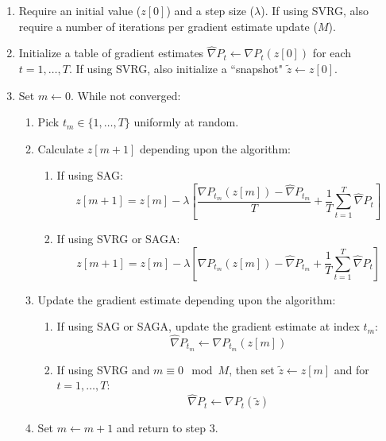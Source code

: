 \begin{enumerate}
    \item Require an initial value ($z[0]$) and a step size ($\lambda$). If using SVRG, also require a number of iterations per gradient estimate update ($M$).
    \item Initialize a table of gradient estimates $\widehat \nabla P_t \leftarrow \nabla P_t (z[0])$ for each $t = 1,\ldots,T$. If using SVRG, also initialize a ``snapshot" $\tilde z \leftarrow z[0]$.
    \item Set $m \leftarrow 0$. While not converged:
    \begin{enumerate}
        \item Pick $t_m \in \{1,\ldots,T\}$ uniformly at random.
        \item Calculate $z[m+1]$ depending upon the algorithm:
        \begin{enumerate}
            \item If using SAG:
            \begin{equation}
                z[m+1] = z[m] - \lambda \left[\frac{\nabla P_{t_m}(z[m]) - \widehat \nabla P_{t_m}}{T} + \frac{1}{T} \sum_{t=1}^T \widehat \nabla P_{t} \right] 
                \label{eqn:SAG_update}
            \end{equation}
            \item If using SVRG or SAGA:
            \begin{equation}
                z[m+1] = z[m] - \lambda \left[\nabla P_{t_m}(z[m]) - \widehat \nabla P_{t_m} + \frac{1}{T} \sum_{t=1}^T \widehat \nabla P_{t} \right]
                \label{eqn:SAGA_update}
            \end{equation}
        \end{enumerate}
        \item Update the gradient estimate depending upon the algorithm:
        \begin{enumerate}
            \item If using SAG or SAGA, update the gradient estimate at index $t_m$:
            \begin{equation}
                \widehat \nabla P_{t_m} \leftarrow \nabla P_{t_m}(z[m])
            \end{equation}
            \item If using SVRG and $m \equiv 0 \mod M$, then set $\tilde z \leftarrow z[m]$ and for $t = 1,\ldots,T$:
            \begin{equation}
                \widehat \nabla P_{t} \leftarrow \nabla P_{t}(\tilde z)
            \end{equation}
        \end{enumerate}
        \item Set $m \leftarrow m+1$ and return to step 3.
    \end{enumerate}
\end{enumerate}

